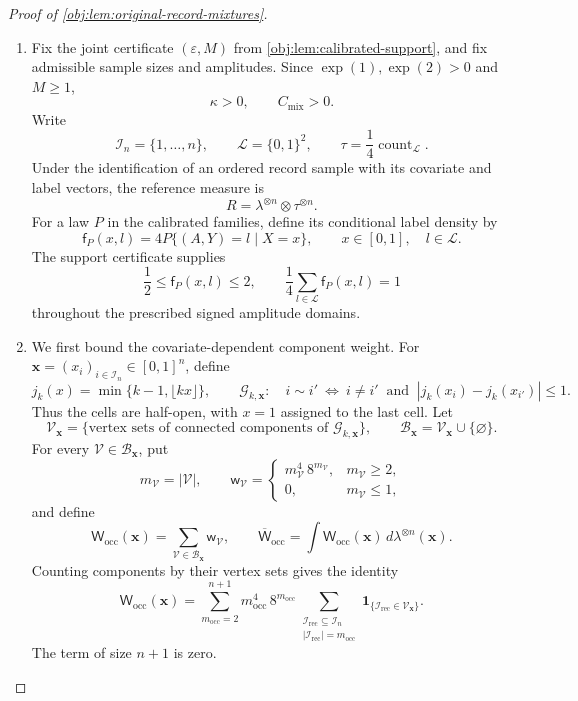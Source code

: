 \documentclass[11pt]{article}
\begin{document}
\begin{proof}[Proof of \cref{obj:lem:original-record-mixtures}]
\begin{enumerate}
\item Fix the joint certificate \((\varepsilon,M)\) from
\cref{obj:lem:calibrated-support}, and fix admissible sample sizes and
amplitudes. Since \(\exp(1),\exp(2)>0\) and \(M\ge1\),
\[
\kappa>0,\qquad C_{\mathrm{mix}}>0.
\]
Write
\[
\mathcal I_n=\{1,\ldots,n\},\qquad
\mathscr L=\{0,1\}^2,\qquad
\tau=\frac14\operatorname{count}_{\mathscr L}.
\]
Under the identification of an ordered record sample with its covariate
and label vectors, the reference measure is
\[
R=\lambda^{\otimes n}\otimes\tau^{\otimes n}.
\]
For a law \(P\) in the calibrated families, define its conditional label
density by
\[
\mathsf f_P(x,l)
=4P\{(A,Y)=l\mid X=x\},
\qquad x\in[0,1],\quad l\in\mathscr L.
\]
The support certificate supplies
\[
\frac12\le \mathsf f_P(x,l)\le2,
\qquad
\frac14\sum_{l\in\mathscr L}\mathsf f_P(x,l)=1
\]
throughout the prescribed signed amplitude domains.

\item We first bound the covariate-dependent component weight. For
\(\mathbf x=(x_i)_{i\in\mathcal I_n}\in[0,1]^n\), define
\[
j_k(x)=\min\{k-1,\lfloor kx\rfloor\},
\qquad
\mathscr G_{k,\mathbf x}:
\quad
i\sim i'
\ \Longleftrightarrow\
i\ne i'\ \text{ and }\ |j_k(x_i)-j_k(x_{i'})|\le1.
\]
Thus the cells are half-open, with \(x=1\) assigned to the last cell.
Let
\[
\mathscr V_{\mathbf x}
=\{\text{vertex sets of connected components of }\mathscr G_{k,\mathbf x}\},
\qquad
\mathscr B_{\mathbf x}=\mathscr V_{\mathbf x}\cup\{\varnothing\}.
\]
For every \(\mathcal V\in\mathscr B_{\mathbf x}\), put
\[
m_{\mathcal V}=|\mathcal V|,
\qquad
\mathsf w_{\mathcal V}
=
\begin{cases}
m_{\mathcal V}^4\,8^{m_{\mathcal V}},&m_{\mathcal V}\ge2,\\
0,&m_{\mathcal V}\le1,
\end{cases}
\]
and define
\[
\mathsf W_{\mathrm{occ}}(\mathbf x)
=\sum_{\mathcal V\in\mathscr B_{\mathbf x}}\mathsf w_{\mathcal V},
\qquad
\overline{\mathsf W}_{\mathrm{occ}}
=\int\mathsf W_{\mathrm{occ}}(\mathbf x)\,
d\lambda^{\otimes n}(\mathbf x).
\]
Counting components by their vertex sets gives the identity
\[
\mathsf W_{\mathrm{occ}}(\mathbf x)
=\sum_{m_{\mathrm{occ}}=2}^{n+1}
m_{\mathrm{occ}}^4\,8^{m_{\mathrm{occ}}}
\sum_{\substack{\mathcal I_{\mathrm{rec}}\subseteq\mathcal I_n\\
|\mathcal I_{\mathrm{rec}}|=m_{\mathrm{occ}}}}
\mathbf1_{\{\mathcal I_{\mathrm{rec}}\in\mathscr V_{\mathbf x}\}}.
\]
The term of size \(n+1\) is zero.


\end{enumerate}
\end{proof}
\end{document}
